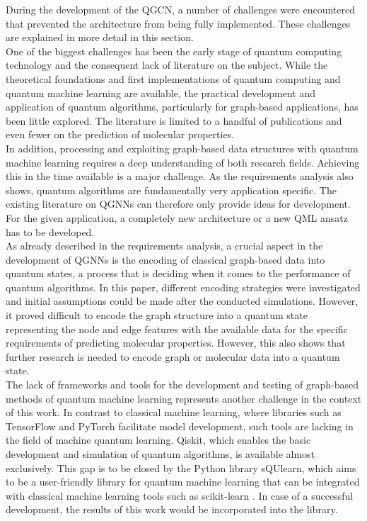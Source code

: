 During the development of the QGCN, a number of challenges were encountered that prevented the architecture from being fully implemented. These challenges are explained in more detail in this section.\\
One of the biggest challenges has been the early stage of quantum computing technology and the consequent lack of literature on the subject. While the theoretical foundations and first implementations of quantum computing and quantum machine learning are available, the practical development and application of quantum algorithms, particularly for graph-based applications, has been little explored. The literature is limited to a handful of publications and even fewer on the prediction of molecular properties. \\
In addition, processing and exploiting graph-based data structures with quantum machine learning requires a deep understanding of both research fields. Achieving this in the time available is a major challenge. As the requirements analysis also shows, quantum algorithms are fundamentally very application specific. The existing literature on QGNNs can therefore only provide ideas for development. For the given application, a completely new architecture or a new QML ansatz has to be developed. \\
As already described in the requirements analysis, a crucial aspect in the development of QGNNs is the encoding of classical graph-based data into quantum states, a process that is deciding when it comes to the performance of quantum algorithms. In this paper, different encoding strategies were investigated and initial assumptions could be made after the conducted simulations. However, it proved difficult to encode the graph structure into a quantum state representing the node and edge features with the available data for the specific requirements of predicting molecular properties. However, this also shows that further research is needed to encode graph or molecular data into a quantum state. \\
The lack of frameworks and tools for the development and testing of graph-based methods of quantum machine learning represents another challenge in the context of this work. In contrast to classical machine learning, where libraries such as TensorFlow and PyTorch facilitate model development, such tools are lacking in the field of machine quantum learning. Qiskit, which enables the basic development and simulation of quantum algorithms, is available almost exclusively. This gap is to be closed by the Python library sQUlearn, which aims to be a user-friendly library for quantum machine learning that can be integrated with classical machine learning tools such as scikit-learn \cite{kreplin2023squlearn}. In case of a successful development, the results of this work would be incorporated into the library. 



